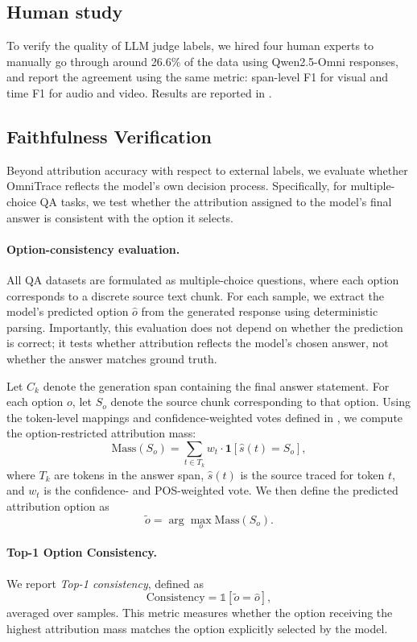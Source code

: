 \subsection{Human study}
\label{appendix:human_study}
To verify the quality of LLM judge labels, we hired four human experts to manually go through around 26.6\% of the data using Qwen2.5-Omni responses, and report the agreement using the same metric: span-level F1 for visual and time F1 for audio and video. Results are reported in .



\subsection{Faithfulness Verification}
\label{appendix:faithfulness_verification}
Beyond attribution accuracy with respect to external labels, we evaluate whether OmniTrace reflects the model’s own decision process.
Specifically, for multiple-choice QA tasks, we test whether the attribution assigned to the model’s final answer is consistent with the option it selects.

\paragraph{Option-consistency evaluation.}
All QA datasets are formulated as multiple-choice questions, where each option corresponds to a discrete source text chunk.
For each sample, we extract the model’s predicted option $\hat{o}$ from the generated response using deterministic parsing. Importantly, this evaluation does not depend on whether the prediction is correct; it tests whether attribution reflects the model’s chosen answer, not whether the answer matches ground truth.

Let $C_k$ denote the generation span containing the final answer statement. For each option $o$, let $S_o$ denote the source chunk corresponding to that option. Using the token-level mappings and confidence-weighted votes defined in , we compute the option-restricted attribution mass:
\[
\text{Mass}(S_o)
=
\sum_{t \in T_k}
w_t \cdot \mathbf{1}[\hat{s}(t)=S_o],
\]
where $T_k$ are tokens in the answer span, $\hat{s}(t)$ is the source traced for token $t$,
and $w_t$ is the confidence- and POS-weighted vote. We then define the predicted attribution option as
\[
\tilde{o}
=
\arg\max_{o} \text{Mass}(S_o).
\]

\paragraph{Top-1 Option Consistency.}
We report \emph{Top-1 consistency}, defined as
\[
\text{Consistency}
=
\mathbb{1}[\tilde{o} = \hat{o}],
\]
averaged over samples.
This metric measures whether the option receiving the highest attribution mass matches the option explicitly selected by the model.

